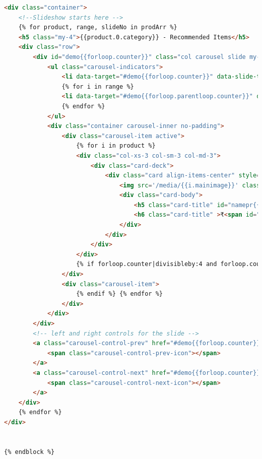 \documentclass[12pt,a4paper]{report}
\begin{document}
\begin{appendices}
\begin{lstlisting}[language=HTML]
<div class="container">
    <!--Slideshow starts here -->
    {% for product, range, slideNo in prodArr %}
    <h5 class="my-4">{{product.0.category}} - Recommended Items</h5>
    <div class="row">
        <div id="demo{{forloop.counter}}" class="col carousel slide my-3" data-ride="carousel">
            <ul class="carousel-indicators">
                <li data-target="#demo{{forloop.counter}}" data-slide-to="0" class="active"></li>
                {% for i in range %}
                <li data-target="#demo{{forloop.parentloop.counter}}" data-slide-to="{{i}}"></li>
                {% endfor %}
            </ul>
            <div class="container carousel-inner no-padding">
                <div class="carousel-item active">
                    {% for i in product %}
                    <div class="col-xs-3 col-sm-3 col-md-3">
                        <div class="card-deck">
                            <div class="card align-items-center" style="width: 18rem;">
                                <img src='/media/{{i.mainimage}}' class="card-img-top" alt="...">
                                <div class="card-body">
                                    <h5 class="card-title" id="namepr{{i.id}}"><a href="{{ i.get_absolute_url }}">{{i.name}}</a></h5>
                                    <h6 class="card-title" >₹<span id="pricepr{{i.id}}">{{i.price}}</span></h6>
                                </div>
                            </div>
                        </div>
                    </div>
                    {% if forloop.counter|divisibleby:4 and forloop.counter > 0 and not forloop.last %}
                </div>
                <div class="carousel-item">
                    {% endif %} {% endfor %}
                </div>
            </div>
        </div>
        <!-- left and right controls for the slide -->
        <a class="carousel-control-prev" href="#demo{{forloop.counter}}" data-slide="prev">
            <span class="carousel-control-prev-icon"></span>
        </a>
        <a class="carousel-control-next" href="#demo{{forloop.counter}}" data-slide="next">
            <span class="carousel-control-next-icon"></span>
        </a>
    </div>
    {% endfor %}
</div>

 
{% endblock %}


	\end{lstlisting}

\end{appendices}
\end{document}
